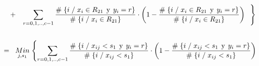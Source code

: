 \documentclass[
  11pt,
  a4paper,
]{article}
\begin{document}
\begin{gather*}
\hspace{0.3cm} +  \hspace{0.3cm}         \sum_{r=0,1,..,c-1}^{}  \dfrac{\# \hspace{0.1 cm}\lbrace i \hspace{0.1 cm}/\hspace{0.1 cm} x_i \in R_{21} \hspace{0.15 cm}\text{y}\hspace{0.15 cm} y_i = r  \rbrace}{\# \hspace{0.1 cm}\lbrace i \hspace{0.1 cm}/\hspace{0.1 cm} x_i \in R_{21}  \rbrace}  \cdot \left(   1 - \dfrac{\# \hspace{0.1 cm}\lbrace i \hspace{0.1 cm}/\hspace{0.1 cm} x_i \in R_{21} \hspace{0.15 cm}\text{y}\hspace{0.15 cm} y_i = r  \rbrace}{\# \hspace{0.1 cm}\lbrace i \hspace{0.1 cm}/\hspace{0.1 cm} x_i \in R_{21}  \rbrace}  \right)            \hspace{0.2cm} \Biggl\}     \\ \\
=\hspace{0.2cm}   \underset{j  ,  s_1}  {Min} \hspace{0.1cm} \Biggl\{     \sum_{r=0,1,..,c-1}^{}  \dfrac{\# \hspace{0.1 cm}\lbrace i \hspace{0.1 cm}/\hspace{0.1 cm} x_{ij} < s_1 \hspace{0.15 cm}\text{y}\hspace{0.15 cm} y_i = r  \rbrace}{\# \hspace{0.1 cm}\lbrace i \hspace{0.1 cm}/\hspace{0.1 cm} x_{ij} < s_1  \rbrace}  \cdot \left(   1 - \dfrac{\# \hspace{0.1 cm}\lbrace i \hspace{0.1 cm}/\hspace{0.1 cm} x_{ij} < s_1 \hspace{0.15 cm}\text{y}\hspace{0.15 cm} y_i = r  \rbrace}{\# \hspace{0.1 cm}\lbrace i \hspace{0.1 cm}/\hspace{0.1 cm} x_{ij} < s_1  \rbrace}  \right) \\ \\

\end{gather*}
\end{document}
